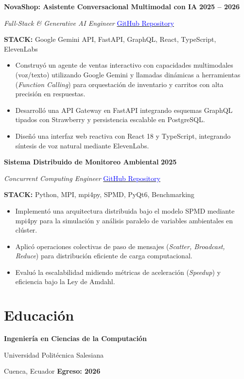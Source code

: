 \documentclass[10pt,a4paper]{article}
\newenvironment{project}[5]{
    \begin{tcolorbox}[
        enhanced,
        colback=cardbg,
        colframe=linecolor,
        boxrule=0.5pt,
        arc=2mm,
        left=3mm,
        right=3mm,
        top=2.5mm,
        bottom=2mm,
        before skip=5pt,
        after skip=5pt,
        breakable
    ]

    {\normalsize\bfseries\color{navy} #1}
    \hfill
    {\small\bfseries\color{blue} #3}

    \vspace{1pt}

    {\small\itshape\color{darktext} #2}
    \hfill
    {\small #4}

    \vspace{3pt}

    {\footnotesize\color{muted}\textbf{STACK:} #5}

    \vspace{2pt}
    \small
    \begin{itemize}
}{
    \end{itemize}
    \end{tcolorbox}
}
\begin{document}
\begin{project}
{NovaShop: Asistente Conversacional Multimodal con IA}
{Full-Stack \& Generative AI Engineer}
{2025 -- 2026}
{\href{https://github.com/David5Uzhca/ai_shopping_assistant}
{\textcolor{blue}{GitHub Repository}}}
{Google Gemini API, FastAPI, GraphQL, React, TypeScript, ElevenLabs}
    \item Construyó un agente de ventas interactivo con capacidades multimodales (voz/texto) utilizando Google Gemini y llamadas dinámicas a herramientas (\textit{Function Calling}) para orquestación de inventario y carritos con alta precisión en respuestas.
    \item Desarrolló una API Gateway en FastAPI integrando esquemas GraphQL tipados con Strawberry y persistencia escalable en PostgreSQL.
    \item Diseñó una interfaz web reactiva con React 18 y TypeScript, integrando síntesis de voz natural mediante ElevenLabs.
\end{project}

\begin{project}
{Sistema Distribuido de Monitoreo Ambiental}
{Concurrent Computing Engineer}
{2025}
{\href{https://github.com/David5Uzhca/Sistema-de-Monitoreo-Ambiental-Concurrente}
{\textcolor{blue}{GitHub Repository}}}
{Python, MPI, mpi4py, SPMD, PyQt6, Benchmarking}
    \item Implementó una arquitectura distribuida bajo el modelo SPMD mediante mpi4py para la simulación y análisis paralelo de variables ambientales en clúster.
    \item Aplicó operaciones colectivas de paso de mensajes (\textit{Scatter, Broadcast, Reduce}) para distribución eficiente de carga computacional.
    \item Evaluó la escalabilidad midiendo métricas de aceleración (\textit{Speedup}) y eficiencia bajo la Ley de Amdahl.
\end{project}

\section{Educación}

\begin{tcolorbox}[
    enhanced,
    colback=lightblue,
    colframe=lightblue,
    boxrule=0pt,
    arc=2mm,
    left=4mm,
    right=4mm,
    top=3mm,
    bottom=3mm
]
    {\large\bfseries\color{navy}
    Ingeniería en Ciencias de la Computación}

    \vspace{2pt}

    {\normalsize Universidad Politécnica Salesiana}

    {\small\color{muted}
    Cuenca, Ecuador
    \hfill
    \textbf{Egreso: 2026}}
\end{tcolorbox}
\end{document}
